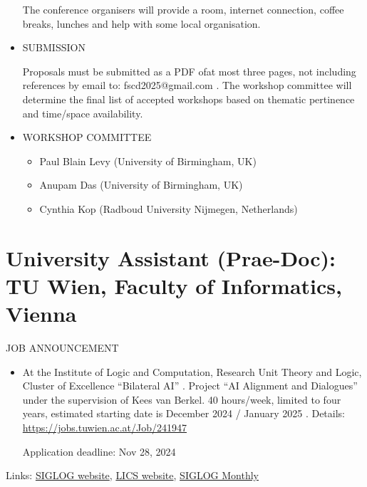 \documentclass[prodmode,acmtecs]{acmsmall} %
\begin{document}
\begin{itemize}
  The conference organisers will provide a room, internet connection, coffee breaks, lunches and help with some local organisation. 
 
\item  SUBMISSION 
 
  Proposals must be submitted as a PDF ofat most three pages, not including references by email to: fscd2025@gmail.com . The workshop committee will determine the final list of accepted workshops based on thematic pertinence and time/space availability. 
 
\item  WORKSHOP COMMITTEE 
 
\begin{itemize}\item  Paul Blain Levy (University of Birmingham, UK)
\item  Anupam Das (University of Birmingham, UK)
\item  Cynthia Kop (Radboud University Nijmegen, Netherlands)
\end{itemize} 
\end{itemize}\section{University Assistant (Prae-Doc): TU Wien, Faculty of Informatics, Vienna}\label{UniversityAssistantPraeDoc}JOB ANNOUNCEMENT 

\begin{itemize}\item  At the Institute of Logic and Computation, Research Unit Theory and Logic, Cluster of Excellence “Bilateral AI” . Project “AI Alignment and Dialogues” under the supervision of Kees van Berkel. 40 hours/week, limited to four years, estimated starting date is December 2024 / January 2025 . Details: \href{https://jobs.tuwien.ac.at/Job/241947}{https://jobs.tuwien.ac.at/Job/241947} 
 
Application deadline: Nov 28, 2024 
 
\end{itemize}


\bigskip Links: \href{http://siglog.org/}{SIGLOG website}, \href{https://lics.siglog.org}{LICS website}, \href{https://lics.siglog.org/newsletters/}{SIGLOG Monthly}
\end{document}

